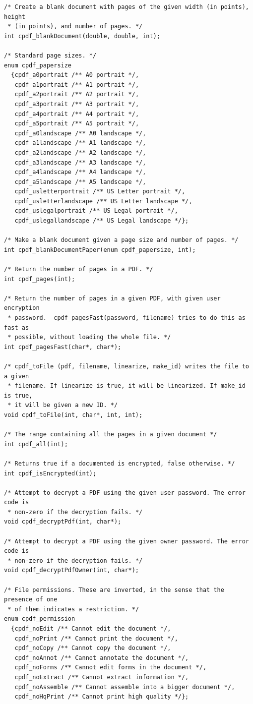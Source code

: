 \documentclass[a4paper]{memoir}
\begin{document}
\begin{small}
\begin{lstlisting}
/* Create a blank document with pages of the given width (in points), height
 * (in points), and number of pages. */
int cpdf_blankDocument(double, double, int);

/* Standard page sizes. */
enum cpdf_papersize
  {cpdf_a0portrait /** A0 portrait */,
   cpdf_a1portrait /** A1 portrait */,
   cpdf_a2portrait /** A2 portrait */,
   cpdf_a3portrait /** A3 portrait */,
   cpdf_a4portrait /** A4 portrait */,
   cpdf_a5portrait /** A5 portrait */,
   cpdf_a0landscape /** A0 landscape */,
   cpdf_a1landscape /** A1 landscape */,
   cpdf_a2landscape /** A2 landscape */,
   cpdf_a3landscape /** A3 landscape */,
   cpdf_a4landscape /** A4 landscape */,
   cpdf_a5landscape /** A5 landscape */,
   cpdf_usletterportrait /** US Letter portrait */,
   cpdf_usletterlandscape /** US Letter landscape */,
   cpdf_uslegalportrait /** US Legal portrait */,
   cpdf_uslegallandscape /** US Legal landscape */};

/* Make a blank document given a page size and number of pages. */
int cpdf_blankDocumentPaper(enum cpdf_papersize, int);

/* Return the number of pages in a PDF. */
int cpdf_pages(int);

/* Return the number of pages in a given PDF, with given user encryption
 * password.  cpdf_pagesFast(password, filename) tries to do this as fast as
 * possible, without loading the whole file. */
int cpdf_pagesFast(char*, char*);

/* cpdf_toFile (pdf, filename, linearize, make_id) writes the file to a given
 * filename. If linearize is true, it will be linearized. If make_id is true,
 * it will be given a new ID. */
void cpdf_toFile(int, char*, int, int);

/* The range containing all the pages in a given document */
int cpdf_all(int);

/* Returns true if a documented is encrypted, false otherwise. */
int cpdf_isEncrypted(int);

/* Attempt to decrypt a PDF using the given user password. The error code is
 * non-zero if the decryption fails. */
void cpdf_decryptPdf(int, char*);

/* Attempt to decrypt a PDF using the given owner password. The error code is
 * non-zero if the decryption fails. */
void cpdf_decryptPdfOwner(int, char*);

/* File permissions. These are inverted, in the sense that the presence of one
 * of them indicates a restriction. */
enum cpdf_permission
  {cpdf_noEdit /** Cannot edit the document */,
   cpdf_noPrint /** Cannot print the document */,
   cpdf_noCopy /** Cannot copy the document */,
   cpdf_noAnnot /** Cannot annotate the document */,
   cpdf_noForms /** Cannot edit forms in the document */,
   cpdf_noExtract /** Cannot extract information */,
   cpdf_noAssemble /** Cannot assemble into a bigger document */,
   cpdf_noHqPrint /** Cannot print high quality */};


\end{lstlisting}
\end{small}
\end{document}
